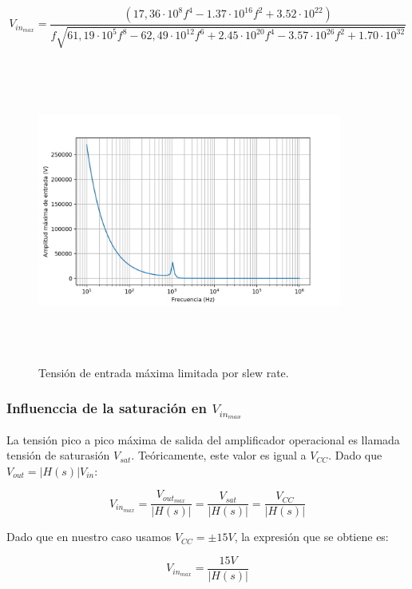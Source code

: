 \begin{equation}
	V_{in_{max}}  = \frac{\left(17,36 \cdot 10^8 f^{4} - 1.37 \cdot 10^{16} f^{2} + 3.52 \cdot 10^{22}\right)}{f \sqrt{61,19 \cdot 10^5 f^{8} - 62,49 \cdot 10^{12} f^{6} + 2.45 \cdot 10^{20} f^{4} - 3.57 \cdot 10^{26} f^{2} + 1.70 \cdot 10^{32}}}		
\label{vin_max}
\end{equation}


\begin{figure}[H] %
	\centering
	\includegraphics[width=10cm,height=10cm,keepaspectratio]{../EJ1/00GRAFICOS/vinmaxsr.png}
	\caption{Tensi\'on de entrada m\'axima limitada por slew rate.}
	\label{vinmaxsr}
\end{figure}

\subsubsection*{Influenccia de la saturaci\'on en $V_{in_{max}}$}
La tensi\'on pico a pico m\'axima de salida del amplificador operacional es llamada 
tensi\'on de saturasi\'on $V_{sat}$. Te\'oricamente, este valor es igual a $V_{CC}$. Dado que $V_{out} = \rvert H(s) \rvert V_{in}$:

\begin{equation}
V_{in_{max}} = \frac{V_{out_{max}}}{\rvert H(s) \rvert} = \frac{V_{sat}}{\rvert H(s) \rvert} = \frac{V_{CC}}{\rvert H(s) \rvert}
\end{equation}

Dado que en nuestro caso usamos $V_{CC} = \pm15V$, la expresi\'on que se obtiene es:

\begin{equation}
V_{in_{max}} = \frac{15V}{\rvert H(s) \rvert} 
\end{equation}

